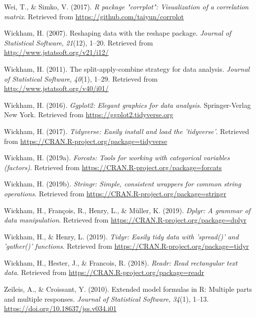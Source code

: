 \documentclass[man]{apa6}
\begin{document}
\leavevmode\hypertarget{ref-R-corrplot2017}{}%
Wei, T., \& Simko, V. (2017). \emph{R package "corrplot": Visualization of a correlation matrix}. Retrieved from \url{https://github.com/taiyun/corrplot}

\leavevmode\hypertarget{ref-R-reshape2}{}%
Wickham, H. (2007). Reshaping data with the reshape package. \emph{Journal of Statistical Software}, \emph{21}(12), 1--20. Retrieved from \url{http://www.jstatsoft.org/v21/i12/}

\leavevmode\hypertarget{ref-R-plyr}{}%
Wickham, H. (2011). The split-apply-combine strategy for data analysis. \emph{Journal of Statistical Software}, \emph{40}(1), 1--29. Retrieved from \url{http://www.jstatsoft.org/v40/i01/}

\leavevmode\hypertarget{ref-R-ggplot2}{}%
Wickham, H. (2016). \emph{Ggplot2: Elegant graphics for data analysis}. Springer-Verlag New York. Retrieved from \url{https://ggplot2.tidyverse.org}

\leavevmode\hypertarget{ref-R-tidyverse}{}%
Wickham, H. (2017). \emph{Tidyverse: Easily install and load the 'tidyverse'}. Retrieved from \url{https://CRAN.R-project.org/package=tidyverse}

\leavevmode\hypertarget{ref-R-forcats}{}%
Wickham, H. (2019a). \emph{Forcats: Tools for working with categorical variables (factors)}. Retrieved from \url{https://CRAN.R-project.org/package=forcats}

\leavevmode\hypertarget{ref-R-stringr}{}%
Wickham, H. (2019b). \emph{Stringr: Simple, consistent wrappers for common string operations}. Retrieved from \url{https://CRAN.R-project.org/package=stringr}

\leavevmode\hypertarget{ref-R-dplyr}{}%
Wickham, H., François, R., Henry, L., \& Müller, K. (2019). \emph{Dplyr: A grammar of data manipulation}. Retrieved from \url{https://CRAN.R-project.org/package=dplyr}

\leavevmode\hypertarget{ref-R-tidyr}{}%
Wickham, H., \& Henry, L. (2019). \emph{Tidyr: Easily tidy data with 'spread()' and 'gather()' functions}. Retrieved from \url{https://CRAN.R-project.org/package=tidyr}

\leavevmode\hypertarget{ref-R-readr}{}%
Wickham, H., Hester, J., \& Francois, R. (2018). \emph{Readr: Read rectangular text data}. Retrieved from \url{https://CRAN.R-project.org/package=readr}

\leavevmode\hypertarget{ref-R-Formula}{}%
Zeileis, A., \& Croissant, Y. (2010). Extended model formulas in R: Multiple parts and multiple responses. \emph{Journal of Statistical Software}, \emph{34}(1), 1--13. \url{https://doi.org/10.18637/jss.v034.i01}

\endgroup
\end{document}

